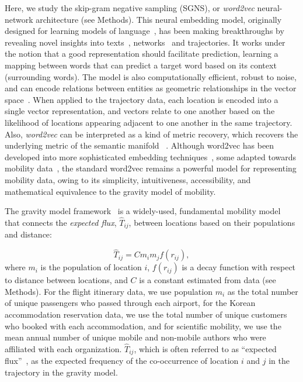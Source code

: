 \documentclass[12pt]{article} %
\begin{document}
Here, we study the skip-gram negative sampling (SGNS), or \textit{word2vec} neural-network architecture (see Methods).
This neural embedding model, originally designed for learning models of language~\autocite{mikolov2013word2vec}, has been making breakthroughs by revealing novel insights into texts~\autocite{tshitoyan2019mat2vec, garg2018gender, kozlowski2018geometry, hamilton2016diachronic, le2014doc2vec, nakandala2017gendered}, networks~\autocite{grover2016node2vec, perozzi2014deepwalk, linzhuo2020hyperbolic} and trajectories\autocite{liu2016exploring, feng2017poi2vec, yao2018representing, cao2019habit2vec, crivellari2019motion, solomon2018predict}.
It works under the notion that a good representation should facilitate prediction, learning a mapping between words that can predict a target word based on its context (surrounding words).
The model is also computationally efficient, robust to noise, and can encode relations between entities as geometric relationships in the vector space~\autocite{levy2014neural, nakandala2017gendered, kozlowski2018geometry, an2018semaxis, hashimoto2016word}.
When applied to the trajectory data, each location is encoded into a single vector representation, and vectors relate to one another based on the likelihood of locations appearing adjacent to one another in the same trajectory. 
Also, \textit{word2vec} can be interpreted as a kind of metric recovery, which recovers the underlying metric of the semantic manifold ~\autocite{hashimoto2016word}.
Although word2vec has been developed into more sophisticated embedding techniques~\autocite{devlin2018bert, pennington2014glove}, some adapted towards mobility data~\autocite{pennington2014glove, zhai2019beyond,gao2018place2vec, bo2017place2vec, simini2021deep}, the standard word2vec remains a powerful model for representing mobility data, owing to its simplicity, intuitiveness, accessibility, and mathematical equivalence to the gravity model of mobility.

The gravity model framework~\autocite{zipf1946gravity} is a widely-used, fundamental mobility model~\autocite{curiel2018citygravity, jung2008highwaygravity, hong2016busgravity, truscott2012epidemicgravity} that connects the \textit{expected flux}, $\hat{T}_{ij}$, between locations based on their populations and distance:

\begin{equation}
	\label{eq:gravity_basic}
	\hat{T}_{ij} = Cm_{i}m_{j}f(r_{ij}),
\end{equation}
where $m_{i}$ is the population of location $i$,  $f(r_{ij})$ is a decay function with respect to distance between locations, and $C$ is a constant estimated from data (see Methods).
For the flight itinerary data, we use population $m_{i}$ as the total number of unique passengers who passed through each airport, for the Korean accommodation reservation data, we use the total number of unique customers who booked with each accommodation, and for scientific mobility, we use the mean annual number of unique mobile and non-mobile authors who were affiliated with each organization.
$\hat{T}_{ij}$, which is often referred to as ``expected flux''~\autocite{simini2012universal},  as the expected frequency of the co-occurrence of location $i$ and $j$ in the trajectory in the gravity model.
\end{document}
